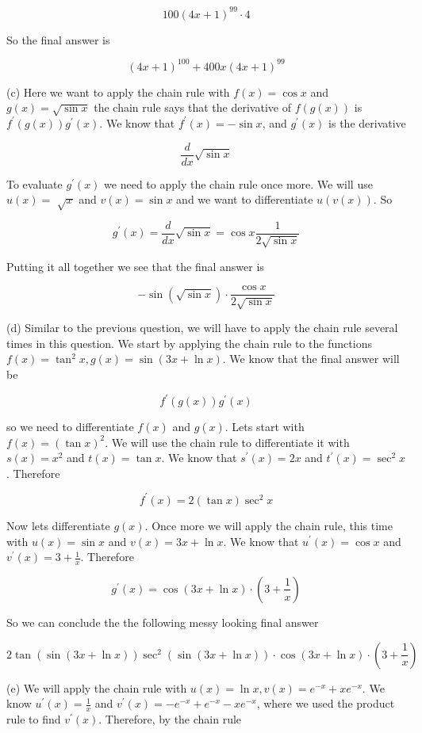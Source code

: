 \documentclass[10pt]{article}
\begin{document}
$$
100(4 x+1)^{99} \cdot 4
$$

So the final answer is

$$
(4 x+1)^{100}+400 x(4 x+1)^{99}
$$

(c) Here we want to apply the chain rule with $f(x)=\cos x$ and $g(x)=\sqrt{\sin x}$ the chain rule says that the derivative of $f(g(x))$ is $f^{\prime}(g(x)) g^{\prime}(x)$. We know that $f^{\prime}(x)=-\sin x$, and $g^{\prime}(x)$ is the derivative

$$
\frac{d}{d x} \sqrt{\sin x}
$$

To evaluate $g^{\prime}(x)$ we need to apply the chain rule once more. We will use $u(x)=$ $\sqrt{x}$ and $v(x)=\sin x$ and we want to differentiate $u(v(x))$. So

$$
g^{\prime}(x)=\frac{d}{d x} \sqrt{\sin x}=\cos x \frac{1}{2 \sqrt{\sin x}}
$$

Putting it all together we see that the final answer is

$$
-\sin (\sqrt{\sin x}) \cdot \frac{\cos x}{2 \sqrt{\sin x}}
$$

(d) Similar to the previous question, we will have to apply the chain rule several times in this question. We start by applying the chain rule to the functions $f(x)=\tan ^{2} x, g(x)=\sin (3 x+\ln x)$. We know that the final answer will be

$$
f^{\prime}(g(x)) g^{\prime}(x)
$$

so we need to differentiate $f(x)$ and $g(x)$. Lets start with $f(x)=(\tan x)^{2}$. We will use the chain rule to differentiate it with $s(x)=x^{2}$ and $t(x)=\tan x$. We know that $s^{\prime}(x)=2 x$ and $t^{\prime}(x)=\sec ^{2} x$. Therefore

$$
f^{\prime}(x)=2(\tan x) \sec ^{2} x
$$

Now lets differentiate $g(x)$. Once more we will apply the chain rule, this time with $u(x)=\sin x$ and $v(x)=3 x+\ln x$. We know that $u^{\prime}(x)=\cos x$ and $v^{\prime}(x)=3+\frac{1}{x}$. Therefore

$$
g^{\prime}(x)=\cos (3 x+\ln x) \cdot\left(3+\frac{1}{x}\right)
$$

So we can conclude the the following messy looking final answer

$$
2 \tan (\sin (3 x+\ln x)) \sec ^{2}(\sin (3 x+\ln x)) \cdot \cos (3 x+\ln x) \cdot\left(3+\frac{1}{x}\right)
$$

(e) We will apply the chain rule with $u(x)=\ln x, v(x)=e^{-x}+x e^{-x}$. We know $u^{\prime}(x)=\frac{1}{x}$ and $v^{\prime}(x)=-e^{-x}+e^{-x}-x e^{-x}$, where we used the product rule to find $v^{\prime}(x)$. Therefore, by the chain rule
\end{document}
